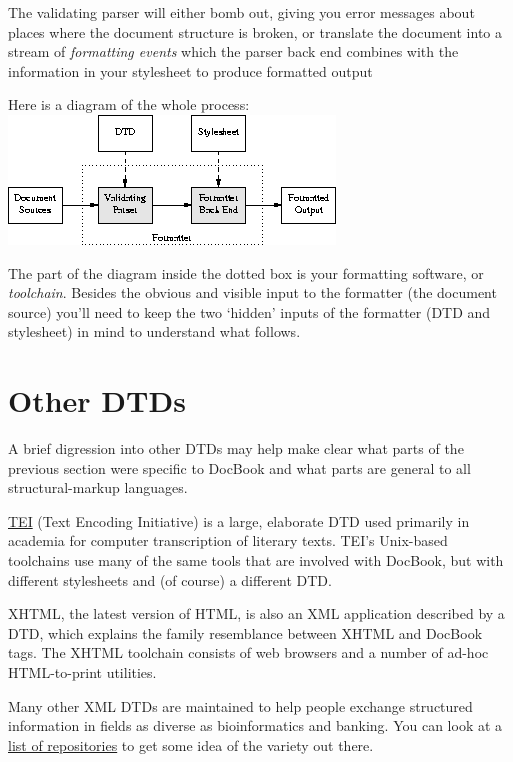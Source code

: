 \documentclass[pdftex,english,a4paper,10pt]{infocom}
\begin{document}
The validating parser will either bomb out, giving you error
messages about places where the document structure is broken, or translate
the document into a stream of {\em formatting events}
which the parser back end combines with the information in your stylesheet
to produce formatted output

Here is a diagram of the whole process:
{{\includegraphics[]{figure1.png}}}

The part of the diagram inside the dotted box is your formatting
software, or {\em toolchain}. Besides the obvious and
visible input to the formatter (the document source) you'll need to
keep the two `hidden' inputs of the formatter (DTD and stylesheet) in
mind to understand what follows.

\section{Other DTDs}
\label{id2719220}\hypertarget{id2719220}{}%

A brief digression into other DTDs may help make clear what parts of
the previous section were specific to DocBook and what parts are general to
all structural-markup languages.

\href{http://www.tei-c.org/}{TEI} (Text Encoding
Initiative) is a large, elaborate DTD used primarily in academia for
computer transcription of literary texts.  TEI's Unix-based toolchains
use many of the same tools that are involved with DocBook, but with
different stylesheets and (of course) a different DTD.

XHTML, the latest version of HTML, is also an XML application
described by a DTD, which explains the family resemblance between
XHTML and DocBook tags. The XHTML toolchain consists of web browsers
and a number of ad-hoc HTML-to-print utilities.

Many other XML DTDs are maintained to help people exchange
structured information in fields as diverse as bioinformatics and
banking.  You can look at a \href{http://www.xml.com/pub/rg/DTD_Repositories}{ list of
repositories} to get some idea of the variety out
there.
\end{document}
